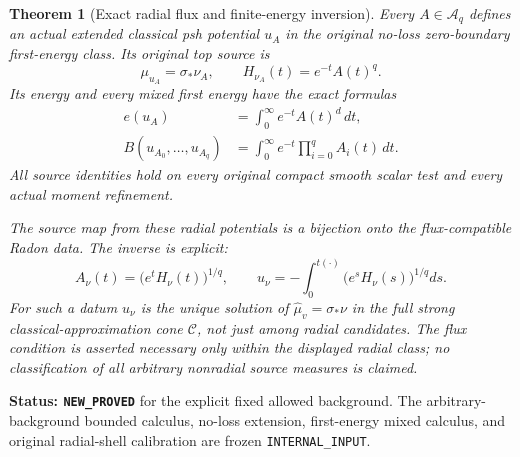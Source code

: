 \documentclass[11pt,a4paper]{article}
\numberwithin{equation}{section}
\newtheorem{theorem}{Theorem}[section]
\theoremstyle{definition}
\theoremstyle{remark}
\begin{document}
\begin{theorem}[Exact radial flux and finite-energy inversion]
\label{thm:r12-exact-radial-flux-inverse}
Every $A\in\mathscr A_q$ defines an actual extended
classical psh potential $u_A$ in the original no-loss
zero-boundary first-energy class.  Its original top source is
\[
 \mu_{u_A}=\sigma_*\nu_A,\qquad
 H_{\nu_A}(t)=e^{-t}A(t)^q.
 \tag{RF5}
\]
Its energy and every mixed first energy have the exact formulas
\[
 \begin{split}
 e(u_A)&=\int_0^\infty e^{-t}A(t)^d\,dt,\\
 B(u_{A_0},\ldots,u_{A_q})
     &=\int_0^\infty e^{-t}\prod_{i=0}^q A_i(t)\,dt.
 \end{split}
 \tag{RF6}
\]
All source identities hold on every original compact smooth
scalar test and every actual moment refinement.

The source map from these radial potentials is a bijection
onto the flux-compatible Radon data.  The inverse is explicit:
\[
 A_\nu(t)=\bigl(e^tH_\nu(t)\bigr)^{1/q},\qquad
 u_\nu=-\int_0^{t(\cdot)}
                     \bigl(e^sH_\nu(s)\bigr)^{1/q}ds.
 \tag{RF7}
\]
For such a datum $u_\nu$ is the unique solution of
$\widehat\mu_v=\sigma_*\nu$ in the \emph{full} strong
classical-approximation cone $\mathscr C$, not just among
radial candidates.  The flux condition is asserted necessary
only within the displayed radial class; no classification of
all arbitrary nonradial source measures is claimed.
\end{theorem}

\noindent\textbf{Status: \texttt{NEW\_PROVED}} for the
explicit fixed allowed background.  The arbitrary-background
bounded calculus, no-loss extension, first-energy mixed
calculus, and original radial-shell calibration are frozen
\texttt{INTERNAL\_INPUT}.
\end{document}
